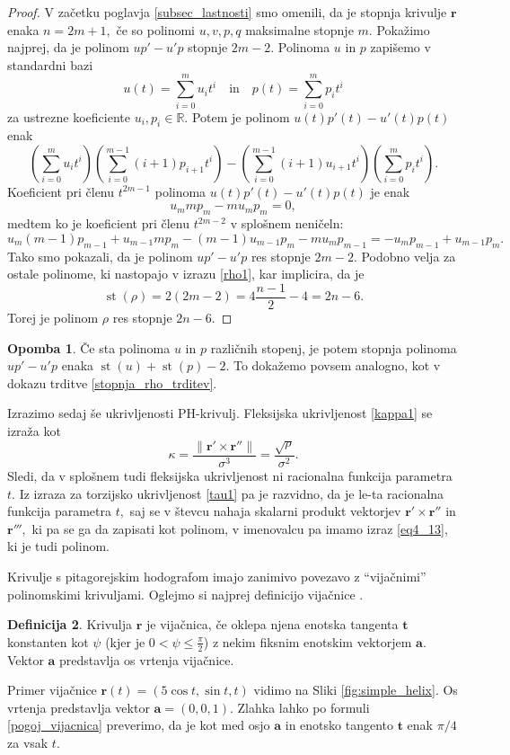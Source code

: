 \documentclass[12pt,a4paper,twoside]{article}
\theoremstyle{definition} %
\newtheorem{definicija}{Definicija}[section]
\newtheorem{opomba}[definicija]{Opomba}
\theoremstyle{plain} %
\theoremstyle{primerstyle}
\numberwithin{equation}{section}  %
\newcommand{\R}{\mathbb R}
\newcommand{\tV}{\mathbf{t}}
\newcommand{\aV}{\mathbf{a}}
\newcommand{\rV}{\mathbf{r}}
\DeclareMathOperator{\st}{st}
\begin{document}
\begin{proof}
	V začetku poglavja \ref{subsec_lastnosti} smo omenili, da je stopnja krivulje $\rV$ enaka $n=2m+1,$ če so polinomi $u,v,p,q$ maksimalne stopnje $m.$ Pokažimo najprej, da je polinom $up'-u'p$ stopnje $2m-2.$ Polinoma $u$ in $p$ zapišemo v standardni bazi
	$$u(t)=\sum_{i=0}^mu_it^i\quad\text{in}\quad p(t)=\sum_{i=0}^mp_it^i$$
	za ustrezne koeficiente $u_i,p_i\in\R.$ Potem je polinom $u(t)p'(t)-u'(t)p(t)$ enak
	\begin{equation*}
		\left(\sum_{i=0}^mu_it^i\right)\left(\sum_{i=0}^{m-1}(i+1)p_{i+1}t^i\right)-\left(\sum_{i=0}^{m-1}(i+1)u_{i+1}t^i\right)\left(\sum_{i=0}^mp_it^i\right)\!.
	\end{equation*}
	Koeficient pri členu $t^{2m-1}$ polinoma $u(t)p'(t)-u'(t)p(t)$ je enak
	$$u_mmp_m-mu_mp_m=0,$$
	medtem ko je koeficient pri členu $t^{2m-2}$ v splošnem neničeln:
	$$u_m(m-1)p_{m-1}+u_{m-1}mp_m-(m-1)u_{m-1}p_m-mu_mp_{m-1}=-u_mp_{m-1}+u_{m-1}p_m.$$
	Tako smo pokazali, da je polinom $up'-u'p$ res stopnje $2m-2$. Podobno velja za ostale polinome, ki nastopajo v izrazu \eqref{rho1}, kar implicira, da je $$\st(\rho)=2(2m-2)=4\frac{n-1}{2}-4=2n-6.$$ Torej je polinom $\rho$ res stopnje $2n-6.$
\end{proof}

\begin{opomba}
	\label{opomba_proporpoly}
	Če sta polinoma $u$ in $p$ različnih stopenj, je potem stopnja polinoma $up'-u'p$ enaka $\st(u)+\st(p)-2.$ To dokažemo povsem analogno, kot v dokazu trditve \ref{stopnja_rho_trditev}.  
\end{opomba}

Izrazimo sedaj še ukrivljenosti PH-krivulj. Fleksijska ukrivljenost \eqref{kappa1} se izraža kot
\begin{equation}
	\label{kappa2}
	\kappa=\frac{\lVert \rV' \times \rV'' \rVert}{\sigma^3}=\frac{\sqrt{\rho}}{\sigma^2}.
\end{equation}
Sledi, da v splošnem tudi fleksijska ukrivljenost ni racionalna funkcija parametra $t.$ Iz izraza za torzijsko ukrivljenost \eqref{tau1} pa je razvidno, da je le-ta racionalna funkcija parametra $t,$ saj se v števcu nahaja skalarni produkt vektorjev $\rV'\times \rV''$ in $\rV''',$ ki pa se ga da zapisati kot polinom, v imenovalcu pa imamo izraz \eqref{eq4_13}, ki je tudi polinom.

Krivulje s pitagorejskim hodografom imajo zanimivo povezavo z ``vijačnimi'' polinomskimi krivuljami. Oglejmo si najprej definicijo vijačnice \cite[str.\ 41]{kreyszig2019differential}.
\begin{definicija}
	\label{definicija_vijacnica}
	Krivulja $\rV$ je vijačnica, če oklepa njena enotska tangenta $\tV$ konstanten kot $\psi$ (kjer je $0<\psi \leq \frac{\pi}{2}$) z nekim fiksnim enotskim vektorjem $\aV.$ Vektor $\aV$ predstavlja os vrtenja vijačnice.
\end{definicija}
Primer vijačnice $\rV(t)=(5\cos{t},\sin{t},t)$ vidimo na Sliki \ref{fig:simple_helix}. Os vrtenja predstavlja vektor $\aV=(0,0,1).$ Zlahka lahko po formuli \eqref{pogoj_vijacnica} preverimo, da je kot med osjo $\aV$ in enotsko tangento $\tV$ enak $\pi/4$ za vsak $t.$ 
\end{document}
